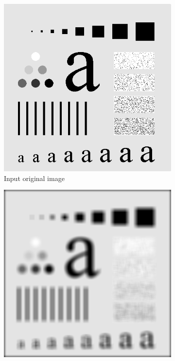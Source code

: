 \documentclass[UTF8]{ctexart}
\begin{document}
\begin{figure}[htbp]
    \centering
    \begin{subfigure}{0.3\textwidth}
        \centering
        \includegraphics[width=\linewidth]{test_pattern_blurring.png}
        \caption{Input original image}
    \end{subfigure}%
    \hfill
    \begin{subfigure}{0.3\textwidth}
        \centering
        \includegraphics[width=\linewidth]{pattern_box_smooth.png}

\end{subfigure}
\end{figure}
\end{document}
